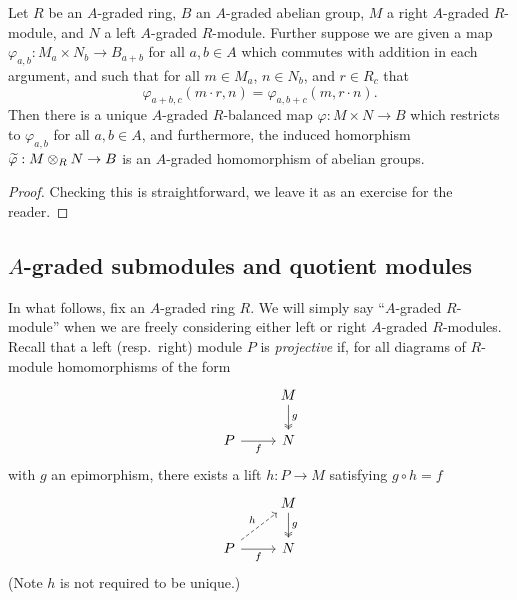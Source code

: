 \documentclass[../main.tex]{subfiles}
\begin{document}
\begin{lemma}\label{tensor_lift_of_A_graded_is_A_graded}
	Let $R$ be an $A$-graded ring, $B$ an $A$-graded abelian group, $M$ a right $A$-graded $R$-module, and $N$ a left $A$-graded $R$-module. Further suppose we are given a map $\varphi_{a,b}:M_a\times N_b\to B_{a+b}$ for all $a,b\in A$ which commutes with addition in each argument, and such that for all $m\in M_a$, $n\in N_b$, and $r\in R_c$ that
	\[\varphi_{a+b,c}(m\cdot r,n)=\varphi_{a,b+c}(m,r\cdot n).\]
	Then there is a unique $A$-graded $R$-balanced map $\varphi:M\times N\to B$ which restricts to $\varphi_{a,b}$ for all $a,b\in A$, and furthermore, the induced homorphism $\widetilde\varphi:M\otimes_RN\to B$ is an $A$-graded homomorphism of abelian groups.
\end{lemma}
\begin{proof}
	Checking this is straightforward, we leave it as an exercise for the reader.
\end{proof}

\subsection{\texorpdfstring{$A$}{A}-graded submodules and quotient modules}

In what follows, fix an $A$-graded ring $R$. We will simply say ``$A$-graded $R$-module'' when we are freely considering either left or right $A$-graded $R$-modules. Recall that a left (resp.\ right) module $P$ is \emph{projective} if, for all diagrams of $R$-module homomorphisms of the form
\[\begin{tikzcd}
	& M \\
	P & N
	\arrow["f"', from=2-1, to=2-2]
	\arrow["g", two heads, from=1-2, to=2-2]
\end{tikzcd}\]
with $g$ an epimorphism, there exists a lift $h:P\to M$ satisfying $g\circ h=f$
\[\begin{tikzcd}
	& M \\
	P & N
	\arrow["f"', from=2-1, to=2-2]
	\arrow["g", two heads, from=1-2, to=2-2]
	\arrow["h", dashed, from=2-1, to=1-2]
\end{tikzcd}\]
(Note $h$ is not required to be unique.)
\end{document}
